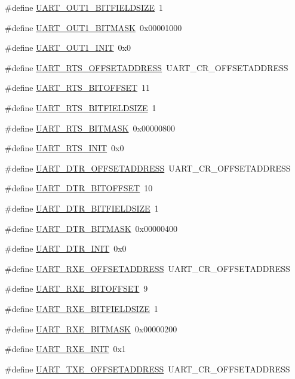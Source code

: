 \begin{DoxyCompactItemize}
\#define \hyperlink{a00575_ac491dca21636eebf8227497c6a31b248}{UART\_\-OUT1\_\-BITFIELDSIZE}~1
\item 
\#define \hyperlink{a00575_a4abe19e0c91be7a01feacaabac073542}{UART\_\-OUT1\_\-BITMASK}~0x00001000
\item 
\#define \hyperlink{a00575_a07387c22ca4fbbd160050c35a6df2bea}{UART\_\-OUT1\_\-INIT}~0x0
\item 
\#define \hyperlink{a00575_a1250d0ed765eac5da96a5c0a8886ba4d}{UART\_\-RTS\_\-OFFSETADDRESS}~UART\_\-CR\_\-OFFSETADDRESS
\item 
\#define \hyperlink{a00575_ac44c46c6c66089802eb7839a86c33799}{UART\_\-RTS\_\-BITOFFSET}~11
\item 
\#define \hyperlink{a00575_a307a6ed4b0a32b405cf8b7558a53a149}{UART\_\-RTS\_\-BITFIELDSIZE}~1
\item 
\#define \hyperlink{a00575_a31fff3461634d59fdf487fccc0af3426}{UART\_\-RTS\_\-BITMASK}~0x00000800
\item 
\#define \hyperlink{a00575_a8248829b470361ce66b3e170eb4ee318}{UART\_\-RTS\_\-INIT}~0x0
\item 
\#define \hyperlink{a00575_a051140ac546140b57fffd05f65df6947}{UART\_\-DTR\_\-OFFSETADDRESS}~UART\_\-CR\_\-OFFSETADDRESS
\item 
\#define \hyperlink{a00575_acd1a55e04576ec52e3c764cba702f422}{UART\_\-DTR\_\-BITOFFSET}~10
\item 
\#define \hyperlink{a00575_a4627c995f4a12f77db115ab536dbc524}{UART\_\-DTR\_\-BITFIELDSIZE}~1
\item 
\#define \hyperlink{a00575_aebee2d047f09e3e1a626a0e29e1cb9ea}{UART\_\-DTR\_\-BITMASK}~0x00000400
\item 
\#define \hyperlink{a00575_ad5e6cb115ac887903e4d159ac7a9b153}{UART\_\-DTR\_\-INIT}~0x0
\item 
\#define \hyperlink{a00575_a008458da9c941f0c42d57118f9bd1162}{UART\_\-RXE\_\-OFFSETADDRESS}~UART\_\-CR\_\-OFFSETADDRESS
\item 
\#define \hyperlink{a00575_a7849466ceb06a7f2071d4041f089a261}{UART\_\-RXE\_\-BITOFFSET}~9
\item 
\#define \hyperlink{a00575_a82c436eb21c6a895bd077eedaf03a01b}{UART\_\-RXE\_\-BITFIELDSIZE}~1
\item 
\#define \hyperlink{a00575_a142d76bbf22ca275959f2c1549b0b6e9}{UART\_\-RXE\_\-BITMASK}~0x00000200
\item 
\#define \hyperlink{a00575_ad9a6c1a54a2696a7ec51c2b4c0330de7}{UART\_\-RXE\_\-INIT}~0x1
\item 
\#define \hyperlink{a00575_ac7594b7d774a1843cdbb5455f8c4be8a}{UART\_\-TXE\_\-OFFSETADDRESS}~UART\_\-CR\_\-OFFSETADDRESS

\end{DoxyCompactItemize}
